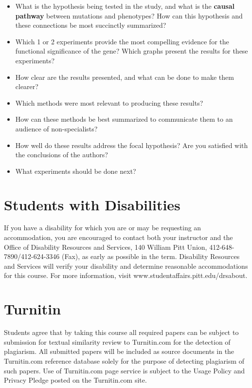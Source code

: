 \documentclass[
]{book}
\providecommand{\tightlist}{%
  \setlength{\itemsep}{0pt}\setlength{\parskip}{0pt}}
\begin{document}
\begin{itemize}
\tightlist
\item
  What is the hypothesis being tested in the study, and what is the \textbf{causal pathway} between mutations and phenotypes? How can this hypothesis and these connections be most succinctly summarized?
\item
  Which 1 or 2 experiments provide the most compelling evidence for the functional significance of the gene? Which graphs present the results for these experiments?
\item
  How clear are the results presented, and what can be done to make them clearer?
\item
  Which methods were most relevant to producing these results?
\item
  How can these methods be best summarized to communicate them to an audience of non-specialists?
\item
  How well do these results address the focal hypothesis? Are you satisfied with the conclusions of the authors?
\item
  What experiments should be done next?
\end{itemize}

\hypertarget{students-with-disabilities}{%
\chapter{Students with Disabilities}\label{students-with-disabilities}}

If you have a disability for which you are or may be requesting an accommodation, you are encouraged to contact both your instructor and the Office of Disability Resources and Services, 140 William Pitt Union, 412-648-7890/412-624-3346 (Fax), as early as possible in the term. Disability Resources and Services will verify your disability and determine reasonable accommodations for this course. For more information, visit www.studentaffairs.pitt.edu/drsabout.

\hypertarget{turnitin}{%
\chapter{Turnitin}\label{turnitin}}

Students agree that by taking this course all required papers can be subject to submission for textual similarity review to Turnitin.com for the detection of plagiarism. All submitted papers will be included as source documents in the Turnitin.com reference database solely for the purpose of detecting plagiarism of such papers. Use of Turnitin.com page service is subject to the Usage Policy and Privacy Pledge posted on the Turnitin.com site.
\end{document}
